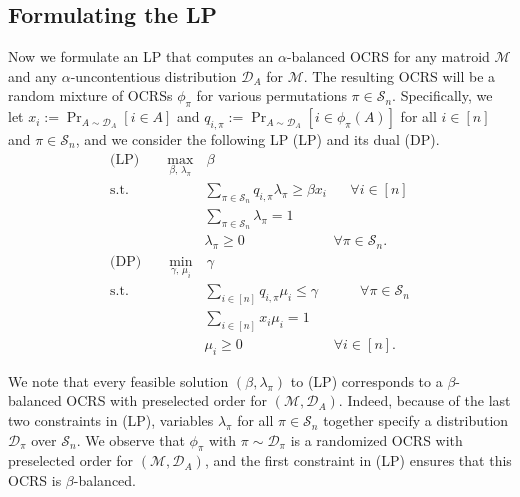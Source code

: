 \documentclass[11pt]{article}
\newcommand{\D}{\mathcal D}
\newcommand{\M}{{\mathcal M}}
\newcommand{\cS}{{\mathcal S}}
\begin{document}
\subsection{Formulating the LP}
Now we formulate an LP that computes an $\alpha$-balanced OCRS for any matroid $\M$ and any $\alpha$-uncontentious distribution $\D_A$ for $\M$. The resulting OCRS will be a random mixture of OCRSs $\phi_{\pi}$ for various permutations $\pi\in\cS_n$. Specifically, we let $x_i:=\Pr_{A\sim\D_A}[i\in A]$ and $q_{i,\pi}:=\Pr_{A\sim\D_A}[i\in\phi_{\pi}(A)]$ for all $i\in[n]$ and $\pi\in\cS_n$, and we consider the following LP (LP) and its dual (DP).
\begin{align}\label{eq:greedy_crs_lp}
    \textrm{(LP)}\qquad\max_{\beta,\,\lambda_{\pi}}&\,\beta\nonumber\\
    \textrm{s.t. }& \sum_{\pi\in\cS_n} q_{i,\pi}\lambda_{\pi}\ge\beta x_i \quad\,\,\,\,\forall i\in [n]\nonumber\\
    & \sum_{\pi\in\cS_n}\lambda_{\pi}=1\nonumber\\
    & \lambda_{\pi}\ge 0 \qquad\qquad\qquad\,\,\forall\pi\in\cS_n.\nonumber\\
    \textrm{(DP)}\qquad\min_{\gamma,\,\mu_i}&\,\gamma\nonumber\\
    \textrm{s.t. }& \sum_{i\in[n]} q_{i,\pi}\mu_i\le\gamma \qquad\,\,\,\,\,\,\forall\pi\in\cS_n\nonumber\\
    & \sum_{i\in[n]}x_i\mu_i=1\nonumber\\
    & \mu_i\ge 0 \qquad\qquad\qquad\,\,\,\forall i\in [n].
\end{align}

We note that every feasible solution $(\beta,\lambda_{\pi})$ to (LP) corresponds to a $\beta$-balanced OCRS with preselected order for $(\M,\D_A)$. Indeed, because of the last two constraints in (LP), variables $\lambda_{\pi}$ for all $\pi\in \cS_n$ together specify a distribution $\D_{\pi}$ over $\cS_n$. We observe that $\phi_{\pi}$ with $\pi\sim\D_{\pi}$ is a randomized OCRS with preselected order for $(\M,\D_A)$, and the first constraint in (LP) ensures that this OCRS is $\beta$-balanced.
\end{document}
